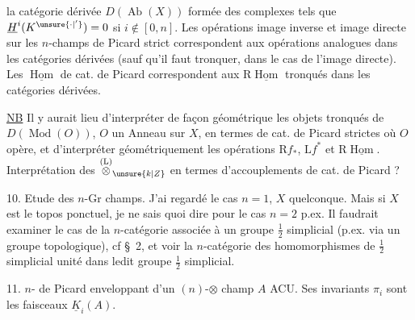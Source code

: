 la catégorie dérivée $D(\operatorname{Ab}(X))$ formée des complexes
  tels que $\underline H^i(K^{\unsure{\cdot|'}})=0$ si $i\notin[0,n]$. Les
opérations image inverse et image directe  sur les
$n$-champs de Picard strict correspondent aux
opérations analogues dans les catégories dérivées (sauf
qu'il faut tronquer, dans le cas de l'image
directe). Les $\underline{\operatorname{Hom}}$ de cat. de Picard 
correspondent aux $\mathrm R\underline{\operatorname{Hom}}$ tronqués  dans les
catégories dérivées.

\uline{NB} Il y aurait lieu d'interpréter de façon
géométrique les objets tronqués de $D(\operatorname{Mod}(O))$,
$O$ un Anneau sur $X$, en termes de cat. de
Picard strictes où $O$ opère, et d'interpréter géométriquement les opérations $\mathrm Rf_*$,  $\mathrm Lf^*$ et $\mathrm R\underline{\operatorname{Hom}}$.
Interprétation des $\overset{(\mathrm L)}{\otimes}_{\unsure{k|Z}}$ en termes d'accouplements
 de cat. de Picard ?

10. Etude des $n$-Gr champs.  J'ai regardé le
cas $n=1$, $X$ quelconque. Mais  si $X$ est le
topos ponctuel, je ne sais quoi dire pour le
cas $n=2$ p.ex. Il faudrait examiner le cas
de la $n$-catégorie associée à un groupe $\frac12$ simplicial (p.ex. via un groupe topologique), cf \S~2, et voir
la $n$-catégorie des homomorphismes de  
$\frac12$ simplicial unité dans ledit groupe $\frac12$ simplicial.

11. $n$- de Picard  enveloppant d'un $(n)$-$\otimes$ champ $A$
ACU. Ses invariants $\pi_i$ sont les faisceaux $\underline{K}_i(A)$.
